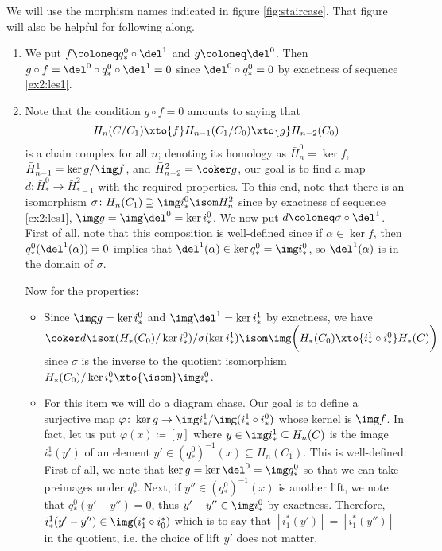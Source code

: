 \begin{solution}
	We will use the morphism names indicated in figure \ref{fig:staircase}.
	That figure will also be helpful for following along.
	\begin{enumerate}
		\item We put $f \coloneq q^0_* \circ \del^1$ and $g \coloneq \del^0$.
			Then $g \circ f = \del^0 \circ q^0_* \circ \del^1 = 0$ since $\del^0 \circ q^0_* = 0$ by exactness of sequence \ref{ex2:les1}.
		\item Note that the condition $g \circ f = 0$ amounts to saying that
			\begin{equation*}
				H_n(C / C_1) \xto{f} H_{n - 1}(C_1 / C_0) \xto{g} H_{n - 2}(C_0)
			\end{equation*}
			is a chain complex for all $n$; denoting its homology as $\bar{H}^0_n = \ker f$, $\bar{H}^1_{n - 1} = \ker g / \img f$, and $\bar{H}^2_{n - 2} = \coker g$, our goal is to find a map $d\colon \bar{H}^0_* \to \bar{H}^2_{* - 1}$ with the required properties.
			To this end, note that there is an isomorphism $\sigma\colon H_n(C_1) \supseteq \img i^0_* \isom \bar{H}^2_n$ since by exactness of sequence \ref{ex2:les1}, $\img g = \img \del^0 = \ker i^0_*$.
			We now put $d \coloneq \sigma \circ \del^1$.
			First of all, note that this composition is well-defined since if $\alpha \in \ker f$, then $q^0_*(\del^1(\alpha)) = 0$ implies that $\del^1(\alpha) \in \ker q^0_* = \img i^0_*$, so $\del^1(\alpha)$ is in the domain of $\sigma$.

			Now for the properties:
			\begin{itemize}
				\item Since $\img g = \ker i^0_*$ and $\img \del^1 = \ker i^1_*$ by exactness, we have $\coker d \isom (H_*(C_0) / \ker i^0_*) / \sigma(\ker i^1_*) \isom \img\bigg(H_*(C_0) \xto{i^1_* \circ i^0_*} H_*(C)\bigg)$ since $\sigma$ is the inverse to the quotient isomorphism $H_*(C_0) / \ker i^0_* \xto{\isom} \img i^0_*$. 
				\item For this item we will do a diagram chase.
					Our goal is to define a surjective map $\varphi\colon \ker g \to \img i^1_* / \img (i^1_* \circ i^0_*)$ whose kernel is $\img f$.
					In fact, let us put $\varphi(x) \coloneq [y]$ where $y \in \img i^1_* \subseteq H_n(C)$ is the image $i^1_*(y')$ of an element $y' \in (q^0_*)^{-1}(x) \subseteq H_n(C_1)$.
					This is well-defined: 
					First of all, we note that $\ker g = \ker \del^0 = \img q^0_*$ so that we can take preimages under $q^0_*$.
					Next, if $y'' \in (q^0_*)^{-1}(x)$ is another lift, we note that $q^0_*(y' - y'') = 0$, thus $y' - y'' \in \img i^0_*$ by exactness. 
					Therefore, $i^1_*(y' - y'') \in \img (i_1^* \circ i_0^*)$ which is to say that $[i_1^*(y')] = [i_1^*(y'')]$ in the quotient, i.e. the choice of lift $y'$ does not matter.


\end{itemize}
\end{enumerate}
\end{solution}
